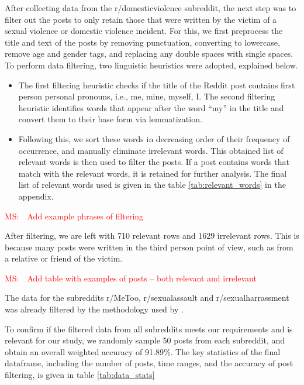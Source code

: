 \documentclass[11pt]{article}
\newcommand{\ms}[1]{\textcolor{red}{{MS:~~#1}}}
\begin{document}
After collecting data from the r/domesticviolence subreddit, the next step was to filter out the posts to only retain those that were written by the victim of a sexual violence or domestic violence incident. 
For this, we first preprocess the title and text of the posts by removing punctuation, converting to lowercase, remove age and gender tags, and replacing any double spaces with single spaces. 
To perform data filtering, two linguistic heuristics were adopted, explained below. 
\begin{itemize}
    \item The first filtering heuristic checks if the title of the Reddit post contains first person personal pronouns, i.e., me, mine, myself, I. The second filtering heuristic identifies words that appear after the word ``my” in the title and convert them to their base form via lemmatization. 
    \item Following this, we sort these words in decreasing order of their frequency of occurrence, and manually eliminate irrelevant words. This obtained list of relevant words is then used to filter the posts. If a post contains words that match with the relevant words, it is retained for further analysis. The final list of relevant words used is given in the table \ref{tab:relevant_words} in the appendix.
\end{itemize}

\ms{Add example phrases of filtering}

After filtering, we are left with 710 relevant rows and 1629 irrelevant rows. 
This is because many posts were written in the third person point of view, such as from a relative or friend of the victim.

\ms{Add table with examples of posts – both relevant and irrelevant} 

The data for the subreddits r/MeToo, r/sexualassault and r/sexualharrassment was already filtered by the methodology used by \citep{garg2024unveiling}. 

To confirm if the filtered data from all subreddits meets our requirements and is relevant for our study, we randomly sample 50 posts from each subreddit, and obtain an overall weighted accuracy of 91.89\%. The key statistics of the final dataframe, including the number of posts, time ranges, and the accuracy of post filtering, is given in table \ref{tab:data_stats} 
\end{document}
